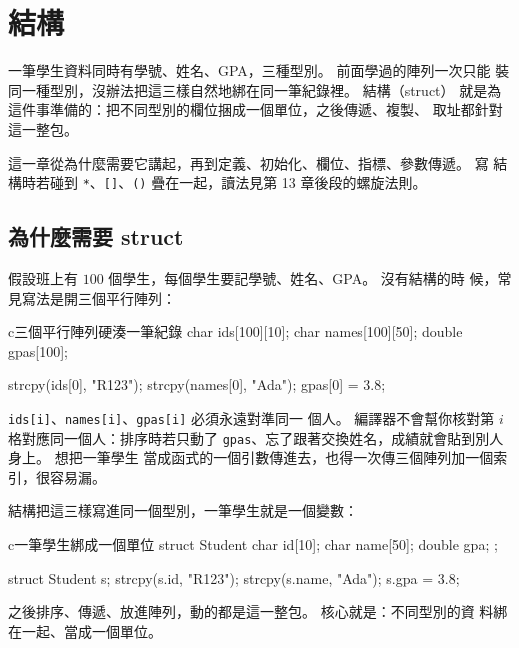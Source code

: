
\chapter{結構}
\label{ch:structure}

一筆學生資料同時有學號、姓名、GPA，三種型別。 前面學過的陣列一次只能
裝同一種型別，沒辦法把這三樣自然地綁在同一筆紀錄裡。 結構（struct）
就是為這件事準備的：把不同型別的欄位捆成一個單位，之後傳遞、複製、
取址都針對這一整包。

這一章從為什麼需要它講起，再到定義、初始化、欄位、指標、參數傳遞。 寫
結構時若碰到 \texttt{*}、\texttt{[]}、\texttt{()} 疊在一起，讀法見第
13 章後段的螺旋法則。

\section{為什麼需要 struct}
\label{sec:struct-motivation}

假設班上有 $100$ 個學生，每個學生要記學號、姓名、GPA。 沒有結構的時
候，常見寫法是開三個平行陣列：

\begin{code}{c}{三個平行陣列硬湊一筆紀錄}
char ids[100][10];
char names[100][50];
double gpas[100];

strcpy(ids[0], "R123");
strcpy(names[0], "Ada");
gpas[0] = 3.8;
\end{code}

\texttt{ids[i]}、\texttt{names[i]}、\texttt{gpas[i]} 必須永遠對準同一
個人。 編譯器不會幫你核對第 $i$ 格對應同一個人：排序時若只動了
\texttt{gpas}、忘了跟著交換姓名，成績就會貼到別人身上。 想把一筆學生
當成函式的一個引數傳進去，也得一次傳三個陣列加一個索引，很容易漏。

結構把這三樣寫進同一個型別，一筆學生就是一個變數：

\begin{code}{c}{一筆學生綁成一個單位}
struct Student {
    char id[10];
    char name[50];
    double gpa;
};

struct Student s;
strcpy(s.id, "R123");
strcpy(s.name, "Ada");
s.gpa = 3.8;
\end{code}

之後排序、傳遞、放進陣列，動的都是這一整包。 核心就是：不同型別的資
料綁在一起、當成一個單位。

